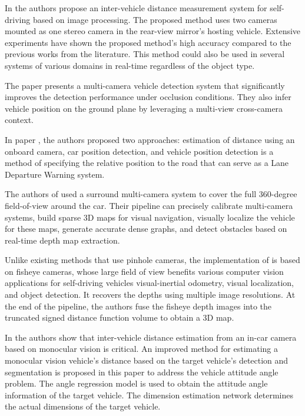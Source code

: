 In \cite{Zaarane2020} the authors propose an inter-vehicle distance measurement system for self-driving based on image processing. The proposed method uses two cameras mounted as one stereo camera in the rear-view mirror's hosting vehicle.  Extensive experiments have shown the proposed method's high accuracy compared to the previous works from the literature. This method could also be used in several systems of various domains in real-time regardless of the object type.

The paper \cite{Wu2019} presents a multi-camera vehicle detection system that significantly improves the detection performance under occlusion conditions. They also infer vehicle position on the ground plane by leveraging a multi-view cross-camera context.

In paper \cite{ Ali2016}, the authors proposed two approaches: estimation of distance using an onboard camera, car position detection, and vehicle position detection is a method of specifying the relative position to the road that can serve as a Lane Departure Warning system. 

The authors of \cite{Hane2017} used a surround multi-camera system to cover the full 360-degree field-of-view around the car. Their pipeline can precisely calibrate multi-camera systems, build sparse 3D maps for visual navigation, visually localize the vehicle for these maps, generate accurate dense graphs, and detect obstacles based on real-time depth map extraction.

Unlike existing methods that use pinhole cameras, the implementation of \cite{Cui2019} is based on fisheye cameras, whose large field of view benefits various computer vision applications for self-driving vehicles visual-inertial odometry, visual localization, and object detection. It recovers the depths using multiple image resolutions. At the end of the pipeline, the authors fuse the fisheye depth images into the truncated signed distance function volume to obtain a 3D map.

In \cite{Huang2019} the authors show that inter-vehicle distance estimation from an in-car camera based on monocular vision is critical.  An improved method for estimating a monocular vision vehicle's distance based on the target vehicle's detection and segmentation is proposed in this paper to address the vehicle attitude angle problem. The angle regression model is used to obtain the attitude angle information of the target vehicle. The dimension estimation network determines the actual dimensions of the target vehicle.

